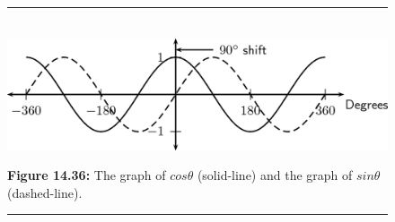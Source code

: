           
        
      
      \label{m39414*uid68}
            \nopagebreak
            
        
        
    \setcounter{subfigure}{0}


	\begin{figure}[H] %
    \begin{center}
    \rule[.1in]{\figurerulewidth}{.005in} \\
        \label{m39414*uid69!!!underscore!!!media}\label{m39414*uid69!!!underscore!!!printimage}\includegraphics{col11306.imgs/m39414_MG10C15_030.png} %
        
      \vspace{2pt}
    \vspace{\rubberspace}\par \begin{cnxcaption}
	  \small \textbf{Figure 14.36: }The graph of \begin{math}cos\theta \end{math} (solid-line) and the graph of \begin{math}sin\theta \end{math} (dashed-line).
	\end{cnxcaption}
      
    \vspace{.1in}
    \rule[.1in]{\figurerulewidth}{.005in} \\
        
    \end{center}

 \end{figure}   

    \addtocounter{footnote}{-0}
    
